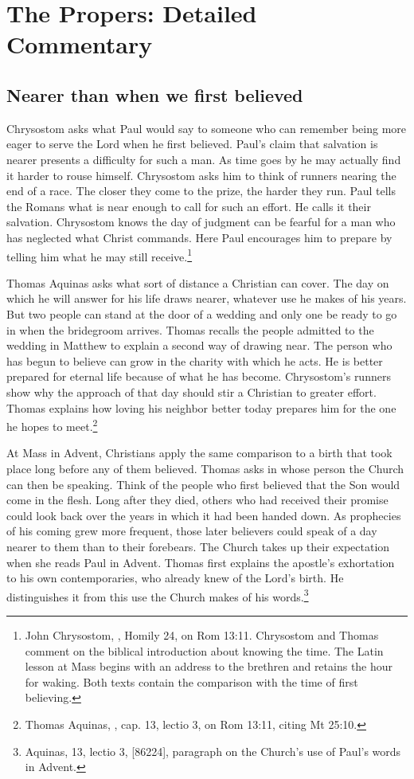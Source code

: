 \section{The Propers: Detailed Commentary}

\subsection{Nearer than when we first believed}

Chrysostom asks what Paul would say to someone who can remember being more eager to serve the Lord when he first believed. Paul's claim that salvation is nearer presents a difficulty for such a man. As time goes by he may actually find it harder to rouse himself. Chrysostom asks him to think of runners nearing the end of a race. The closer they come to the prize, the harder they run. Paul tells the Romans what is near enough to call for such an effort. He calls it their salvation. Chrysostom knows the day of judgment can be fearful for a man who has neglected what Christ commands. Here Paul encourages him to prepare by telling him what he may still receive.\footnote{John Chrysostom, , Homily 24, on Rom 13:11. Chrysostom and Thomas comment on the biblical introduction about knowing the time. The Latin lesson at Mass begins with an address to the brethren and retains the hour for waking. Both texts contain the comparison with the time of first believing.}

Thomas Aquinas asks what sort of distance a Christian can cover. The day on which he will answer for his life draws nearer, whatever use he makes of his years. But two people can stand at the door of a wedding and only one be ready to go in when the bridegroom arrives. Thomas recalls the people admitted to the wedding in Matthew to explain a second way of drawing near. The person who has begun to believe can grow in the charity with which he acts. He is better prepared for eternal life because of what he has become. Chrysostom's runners show why the approach of that day should stir a Christian to greater effort. Thomas explains how loving his neighbor better today prepares him for the one he hopes to meet.\footnote{Thomas Aquinas, , cap. 13, lectio 3, on Rom 13:11, citing Mt 25:10.}

At Mass in Advent, Christians apply the same comparison to a birth that took place long before any of them believed. Thomas asks in whose person the Church can then be speaking. Think of the people who first believed that the Son would come in the flesh. Long after they died, others who had received their promise could look back over the years in which it had been handed down. As prophecies of his coming grew more frequent, those later believers could speak of a day nearer to them than to their forebears. The Church takes up their expectation when she reads Paul in Advent. Thomas first explains the apostle's exhortation to his own contemporaries, who already knew of the Lord's birth. He distinguishes it from this use the Church makes of his words.\footnote{Aquinas,  13, lectio 3, [86224], paragraph on the Church's use of Paul's words in Advent.}


